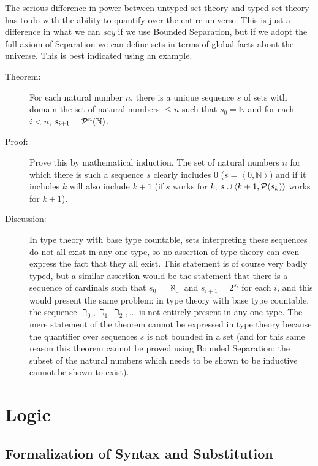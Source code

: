\documentclass[12pt]{book}
\begin{document}
The serious difference in power between untyped set theory and typed
set theory has to do with the ability to quantify over the entire
universe.  This is just a difference in what we can {\em say\/} if we
use Bounded Separation, but if we adopt the full axiom of Separation
we can define sets in terms of global facts about the universe.  This
is best indicated using an example.

\begin{description}

\item[Theorem:] For each natural number $n$, there is a unique
sequence $s$ of sets with domain the set of natural numbers $\leq n$
such that $s_0 = {\mathbb N}$ and for each $i<n$, $s_{i+1}={\cal
P}^n({\mathbb N})$.

\item[Proof:]  Prove this by mathematical induction.  The set of natural
numbers $n$ for which there is such a sequence $s$ clearly includes 0
($s=\left<0,{\mathbb N}\right>$) and if it includes $k$ will also include $k+1$
(if $s$ works for $k$, $s \cup \left<k+1,{\cal P}(s_k)\right>$ works for $k+1$).

\item[Discussion:] In type theory with base type countable, sets
interpreting these sequences do not all exist in any one type, so no
assertion of type theory can even express the fact that they all
exist.  This statement is of course very badly typed, but a similar
assertion would be the statement that there is a sequence of cardinals
such that $s_0 = \aleph_0$ and $s_{i+1}=2^{s_i}$ for each $i$, and
this would present the same problem: in type theory with base type
countable, the sequence $\beth_0,\beth_1\,\beth_2,\ldots$ is not entirely
present in any one type.  The mere statement of the theorem cannot be
expressed in type theory because the quantifier over sequences $s$ is
not bounded in a set (and for this same reason this theorem cannot be
proved using Bounded Separation: the subset of the natural numbers
which needs to be shown to be inductive cannot be shown to exist).

\end{description}

\newpage

\chapter{Logic}

\section{Formalization of Syntax and Substitution}
\end{document}
